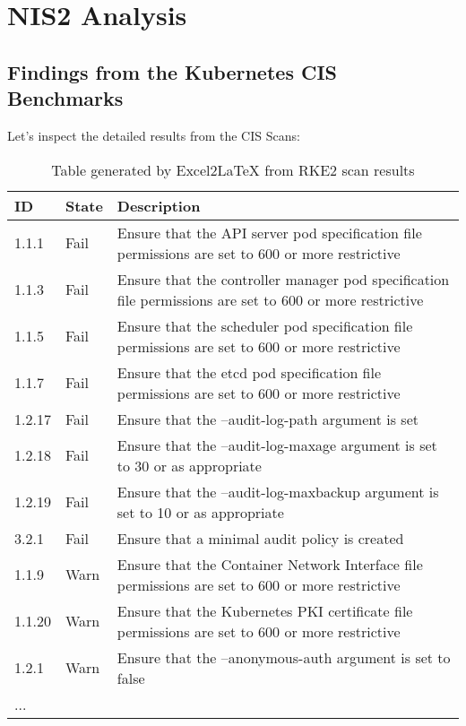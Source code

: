 %
%

\pagebreak
\section{NIS2 Analysis}

\onehalfspacing

\subsection{Findings from the Kubernetes CIS Benchmarks}

Let's inspect the detailed results from the CIS Scans:

\begin{table}[h]
  \centering
  \caption{Table generated by Excel2LaTeX from RKE2 scan results}
    \begin{tabular}{| l | l | p{11.6cm} |}
    \hline
    ID & State & Description \\
    \hline\hline
    1.1.1 & Fail  & Ensure that the API server pod specification file permissions are set to 600 or more restrictive \\
    \hline
    1.1.3 & Fail  & Ensure that the controller manager pod specification file permissions are set to 600 or more restrictive \\
    \hline
    1.1.5 & Fail  & Ensure that the scheduler pod specification file permissions are set to 600 or more restrictive \\
    \hline
    1.1.7 & Fail  & Ensure that the etcd pod specification file permissions are set to 600 or more restrictive \\
    \hline
    1.2.17 & Fail  & Ensure that the --audit-log-path argument is set \\
    \hline
    1.2.18 & Fail  & Ensure that the --audit-log-maxage argument is set to 30 or as appropriate \\
    \hline
    1.2.19 & Fail  & Ensure that the --audit-log-maxbackup argument is set to 10 or as appropriate \\
    \hline
    3.2.1 & Fail  & Ensure that a minimal audit policy is created \\
    \hline
    1.1.9 & Warn  & Ensure that the Container Network Interface file permissions are set to 600 or more restrictive \\
    \hline
    1.1.20 & Warn  & Ensure that the Kubernetes PKI certificate file permissions are set to 600 or more restrictive \\
    \hline
    1.2.1 & Warn  & Ensure that the --anonymous-auth argument is set to false \\
    \hline
    ... & & \\
    \hline
    \end{tabular}%
  \label{tab:rke2Scan}%
\end{table}%


